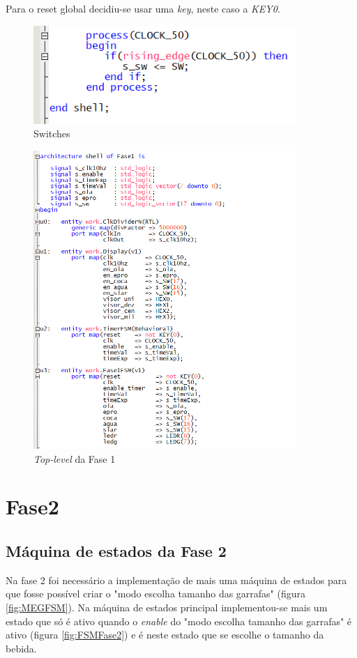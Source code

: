 \documentclass{report}
\begin{document}
Para o reset global decidiu-se usar uma \textit{key}, neste caso a \textit{KEY0}.

\begin{figure}[H]
    \centering
    \includegraphics[width = 10cm]{Fase1TopLevelSWs.png}
    \caption{Switches}
    \label{fig:Switches}
\end{figure}

\begin{figure}[H]
    \centering
    \includegraphics[width = 10cm]{Fase1TopLevelSHELL.png}
    \caption{\textit{Top-level} da Fase 1}
    \label{fig:TLF1}
\end{figure}

\newpage

\section{Fase2}

\subsection{Máquina de estados da Fase 2}
Na fase 2 foi necessário a implementação de mais uma máquina de estados para que fosse possível criar o "modo escolha tamanho das garrafas" (figura \ref{fig:MEGFSM}). Na máquina de estados principal implementou-se mais um estado que só é ativo quando o \textit{enable} do "modo escolha tamanho das garrafas" é ativo (figura \ref{fig:FSMFase2}) e é neste estado que se escolhe o tamanho da bebida. 
\end{document}
